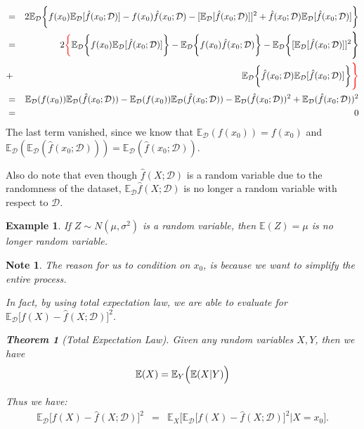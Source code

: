 \documentclass{article}
\theoremstyle{MyNonumberplain}
\theoremstyle{break}
\newcommand{\ev}{\mathbb{E}}
\newcommand{\evd}{\ev_{\mathcal{D}}}
\theoremstyle{break}
\newtheorem{theorem}{Theorem}[section]
\newtheorem{example}{Example}[section]
\newtheorem{note}{Note}
\theoremstyle{break}
\theoremstyle{break}
\begin{document}
\begin{thmbox}
    \begin{prfbox}
        \begin{eqnarray*}
            &=& 2 \evd \biggl\{f(x_0)\evd[\hat{f}(x_0;\mathcal{D})]-f(x_0)\hat{f}(x_0;\mathcal{D})-[\evd[\hat{f}(x_0;\mathcal{D})]]^2+\hat{f}(x_0;\mathcal{D})\evd[\hat{f}(x_0;\mathcal{D})]\biggr\} \\
            &=& 2  \textcolor{red}{\biggl\{}\evd\biggl\{f(x_0)\evd[\hat{f}(x_0;\mathcal{D})]\biggr\}-\evd\biggl\{f(x_0)\hat{f}(x_0;\mathcal{D})\biggr\}-\evd\biggl\{[\evd[\hat{f}(x_0;\mathcal{D})]]^2\Biggr\} \\
            &+& \evd\biggl\{\hat{f}(x_0;\mathcal{D})\evd[\hat{f}(x_0;\mathcal{D})]\biggr\}\textcolor{red}{\Biggr\}}\\
            &=& \evd(f(x_0))\evd(\hat{f}(x_0;\mathcal{D}))-\evd(f(x_0))\evd(\hat{f}(x_0;\mathcal{D}))-\evd(\hat{f}(x_0;\mathcal{D}))^2+\evd(\hat{f}(x_0;\mathcal{D}))^2\\
            &=& 0
        \end{eqnarray*}
        The last term vanished, since we know that $\evd(f(x_0))=f(x_0)$ and $\evd(\evd(\hat{f}(x_0;\mathcal{D}))) = \evd(\hat{f}(x_0;\mathcal{D})).$

        \bigskip
        Also do note that even though $\hat{f}(X;\mathcal{D})$ is a random variable due to the randomness of the dataset, $\evd\hat{f}(X;\mathcal{D})$ is 
        no longer a random variable with respect to $\mathcal{D}$.

        \begin{expbox}
            \begin{example}
                If $Z\sim N(\mu,\sigma^2)$ is a random variable, then $\ev(Z)=\mu$ is no longer random variable.
            \end{example}
        \end{expbox}

    \end{prfbox}
\end{thmbox}
\begin{notebox}
    \begin{note}
        The reason for us to condition on $x_0$, is because we want to simplify the entire process.

        In fact, by using total expectation law, we are able to evaluate for $\evd\bigl[f(X)-\hat{f}(X;\mathcal{D})\bigr]^2$.

        \begin{thmbox}
            \begin{theorem}[Total Expectation Law]
                Given any random variables $X,Y$, then we have 
                $$\ev(X)=\ev_Y\Bigl(\ev(X|Y)\Bigr)$$ 
            \end{theorem}
        \end{thmbox}
        Thus we have: 
        \begin{eqnarray*}
            \evd\bigl[f(X)-\hat{f}(X;\mathcal{D})\bigr]^2 &=& \ev_X\biggl[\evd\bigl[f(X)-\hat{f}(X;\mathcal{D})\bigr]^2|X=x_0\biggr].
        \end{eqnarray*}
    \end{note}
\end{notebox}
\end{document}

